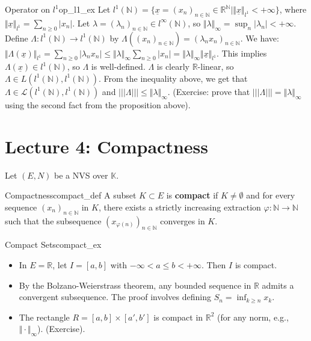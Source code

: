 \documentclass[11pt, a4paper]{article}
\newcommand{\R}{\mathbb{R}}
\newcommand{\N}{\mathbb{N}}
\begin{document}
\begin{example}{Operator on $l^1$}{op_l1_ex}
Let $l^1(\N) = \{ \underline{x} = (x_n)_{n \in \N} \in \R^\N \mid \Vert \underline{x} \Vert_{l^1} < +\infty \}$, where $\Vert \underline{x} \Vert_{l^1} = \sum_{n \ge 0} |x_n|$.
Let $\lambda = (\lambda_n)_{n \in \N} \in l^\infty(\N)$, so $\Vert \lambda \Vert_\infty = \sup_n |\lambda_n| < +\infty$.
Define $\Lambda: l^1(\N) \to l^1(\N)$ by $\Lambda((x_n)_{n \in \N}) = (\lambda_n x_n)_{n \in \N}$.
We have:
$\Vert \Lambda(\underline{x}) \Vert_{l^1} = \sum_{n \ge 0} |\lambda_n x_n| \le \Vert \lambda \Vert_\infty \sum_{n \ge 0} |x_n| = \Vert \lambda \Vert_\infty \Vert \underline{x} \Vert_{l^1}$.
This implies $\Lambda(\underline{x}) \in l^1(\N)$, so $\Lambda$ is well-defined.
$\Lambda$ is clearly $\R$-linear, so $\Lambda \in L(l^1(\N), l^1(\N))$.
From the inequality above, we get that $\Lambda \in \mathcal{L}(l^1(\N), l^1(\N))$ and $|||\Lambda||| \le \Vert \lambda \Vert_\infty$.
(Exercise: prove that $|||\Lambda||| = \Vert \lambda \Vert_\infty$ using the second fact from the proposition above).
\end{example}

\section{Lecture 4: Compactness}
Let $(E, N)$ be a NVS over $\mathbb{K}$.

\begin{definition}{Compactness}{compact_def}
A subset $K \subset E$ is \textbf{compact} if $K \neq \emptyset$ and for every sequence $(x_n)_{n \in \N}$ in $K$, there exists a strictly increasing extraction $\varphi: \N \to \N$ such that the subsequence $(x_{\varphi(n)})_{n \in \N}$ converges in $K$.
\end{definition}

\begin{example}{Compact Sets}{compact_ex}
\begin{itemize}
    \item In $E = \R$, let $I = [a, b]$ with $-\infty < a \le b < +\infty$. Then $I$ is compact.
    \item By the Bolzano-Weierstrass theorem, any bounded sequence in $\R$ admits a convergent subsequence. The proof involves defining $S_n = \inf_{k \ge n} x_k$.
    \item The rectangle $R = [a, b] \times [a', b']$ is compact in $\R^2$ (for any norm, e.g., $\Vert \cdot \Vert_\infty$). (Exercise).
\end{itemize}
\end{example}
\end{document}
